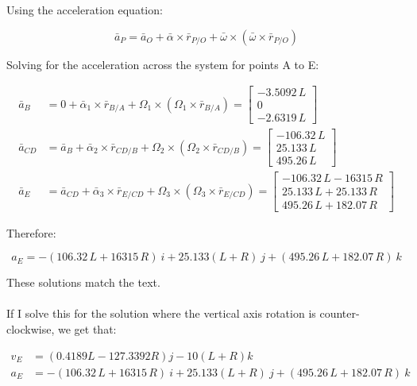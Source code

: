 \documentclass[12pt, letterpaper]{../assignment}
\begin{document}
Using the acceleration equation:

$$ \bar{a}_P = \bar{a}_O + \bar{\alpha} \times \bar{r}_{P/O} + \bar{\omega} \times \left( \bar{\omega} \times \bar{r}_{P/O} \right)$$

Solving for the acceleration across the system for points A to E:

\begin{equation*}
    \begin{aligned}
        \bar{a}_B &= 0 + \bar{\alpha}_1 \times \bar{r}_{B/A} + \Omega_1 \times \left(\Omega_1 \times \bar{r}_{B/A}\right)
        =\left[\begin{array}{c} -3.5092\,L\\ 0\\ -2.6319\,L \end{array}\right]\\
        \bar{a}_{CD} &= \bar{a}_B + \bar{\alpha}_2 \times \bar{r}_{CD/B} + \Omega_2 \times \left(\Omega_2 \times \bar{r}_{CD/B}\right)
        =\left[\begin{array}{c} -106.32\,L\\ 25.133\,L\\ 495.26\,L \end{array}\right]\\
        \bar{a}_E &= \bar{a}_{CD} + \bar{\alpha}_3 \times \bar{r}_{E/CD} + \Omega_3 \times \left(\Omega_3 \times \bar{r}_{E/CD}\right)
        =\left[\begin{array}{c} -106.32\,L-16315\,R\\ 25.133\,L+25.133\,R\\ 495.26\,L+182.07\,R \end{array}\right]
    \end{aligned}
\end{equation*}

Therefore:

\begin{answer}
$$ a_E = -(106.32\,L+16315\,R)\ i + 25.133(L+R)\ j + (495.26\,L+182.07\,R)\ k $$
\end{answer}

These solutions match the text.
\\\\
If I solve this for the solution where the vertical axis rotation is counter-clockwise,
we get that:

\begin{answer}
    \begin{equation*}
        \begin{aligned}
    v_E &= \left( 0.4189L - 127.3392R \right)j - 10 \left(L+R\right)k \\
    a_E &= -(106.32\,L+16315\,R)\ i + 25.133(L+R)\ j + (495.26\,L+182.07\,R)\ k 
\end{aligned}
\end{equation*}
\end{answer}
    
\end{document}
